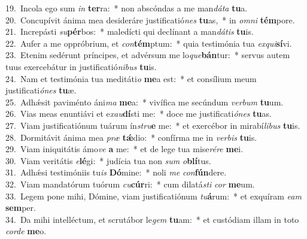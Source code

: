 {19.~}Incola ego sum \textit{in} \textbf{ter}ra:~* non abscóndas a me man\textit{dá}\textit{ta} \textbf{tu}a.\\
{20.~}Concupívit ánima mea desideráre justificatió\textit{nes} \textbf{tu}as,~* in \textit{om}\textit{ni} \textbf{tém}pore.\\
{21.~}Increpásti \textit{su}\textbf{pér}bos:~* maledícti qui declínant a man\textit{dá}\textit{tis} \textbf{tu}is.\\
{22.~}Aufer a me oppróbrium, et \textit{con}\textbf{tém}ptum:~* quia testimónia tua \textit{ex}\textit{qui}\textbf{sí}vi.\\
{23.~}Etenim sedérunt príncipes, et advérsum me lo\textit{que}\textbf{bán}tur:~* servus autem tuus exercebátur in justificatió\textit{ni}\textit{bus} \textbf{tu}is.\\
{24.~}Nam et testimónia tua meditáti\textit{o} \textbf{me}a est:~* et consílium meum justificati\textit{ó}\textit{nes} \textbf{tu}æ.\\
{25.~}Adhǽsit paviménto áni\textit{ma} \textbf{me}a:~* vivífica me secúndum \textit{ver}\textit{bum} \textbf{tu}um.\\
{26.~}Vias meas enuntiávi et e\textit{xau}\textbf{dí}sti me:~* doce me justificati\textit{ó}\textit{nes} \textbf{tu}as.\\
{27.~}Viam justificatiónum tuárum ín\textit{stru}\textbf{e} me:~* et exercébor in mirabí\textit{li}\textit{bus} \textbf{tu}is.\\
{28.~}Dormitávit ánima mea \textit{præ} \textbf{tǽ}dio:~* confírma me in \textit{ver}\textit{bis} \textbf{tu}is.\\
{29.~}Viam iniquitátis ámo\textit{ve} \textbf{a} me:~* et de lege tua mise\textit{ré}\textit{re} \textbf{me}i.\\
{30.~}Viam veritátis \textit{e}\textbf{lé}gi:~* judícia tua non \textit{sum} \textit{o}\textbf{blí}tus.\\
{31.~}Adhǽsi testimóniis tu\textit{is} \textbf{Dó}mine:~* noli \textit{me} \textit{con}\textbf{fún}dere.\\
{32.~}Viam mandatórum tuórum \textit{cu}\textbf{cúr}ri:~* cum dilatá\textit{sti} \textit{cor} \textbf{me}um.\\
{33.~}Legem pone mihi, Dómine, viam justificatiónum \textit{tu}\textbf{á}rum:~* et exquíram \textit{e}\textit{am} \textbf{sem}per.\\
{34.~}Da mihi intelléctum, et scrutábor le\textit{gem} \textbf{tu}am:~* et custódiam illam in toto \textit{cor}\textit{de} \textbf{me}o.\\
